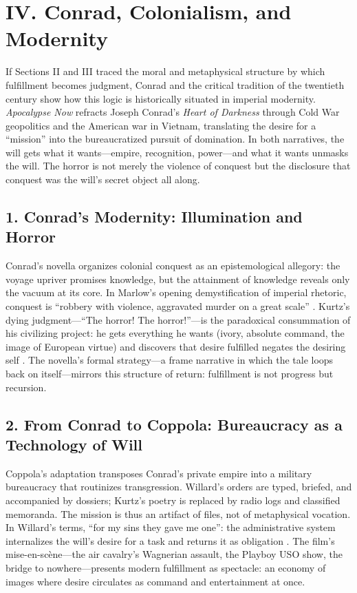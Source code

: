 \section*{IV. Conrad, Colonialism, and Modernity}
\label{sec:iv-conrad-colonialism-and-modernity}

If Sections II and III traced the moral and metaphysical structure by which fulfillment becomes judgment, Conrad and the critical tradition of the twentieth century show how this logic is historically situated in imperial modernity. \textit{Apocalypse Now} refracts Joseph Conrad’s \textit{Heart of Darkness} through Cold War geopolitics and the American war in Vietnam, translating the desire for a ``mission'' into the bureaucratized pursuit of domination. In both narratives, the will gets what it wants---empire, recognition, power---and what it wants unmasks the will. The horror is not merely the violence of conquest but the disclosure that conquest was the will’s secret object all along.

\subsection*{1. Conrad’s Modernity: Illumination and Horror}
\label{ssec:1-conrad-s-modernity-illumination-and-horror}
Conrad’s novella organizes colonial conquest as an epistemological allegory: the voyage upriver promises knowledge, but the attainment of knowledge reveals only the vacuum at its core. In Marlow’s opening demystification of imperial rhetoric, conquest is ``robbery with violence, aggravated murder on a great scale'' . Kurtz’s dying judgment---``The horror! The horror!''---is the paradoxical consummation of his civilizing project: he gets everything he wants (ivory, absolute command, the image of European virtue) and discovers that desire fulfilled negates the desiring self . The novella’s formal strategy---a frame narrative in which the tale loops back on itself---mirrors this structure of return: fulfillment is not progress but recursion.

\subsection*{2. From Conrad to Coppola: Bureaucracy as a Technology of Will}
\label{ssec:2-from-conrad-to-coppola-bureaucracy-as-a-technology-of-will}
Coppola’s adaptation transposes Conrad’s private empire into a military bureaucracy that routinizes transgression. Willard’s orders are typed, briefed, and accompanied by dossiers; Kurtz’s poetry is replaced by radio logs and classified memoranda. The mission is thus an artifact of files, not of metaphysical vocation. In Willard’s terms, ``for my sins they gave me one'': the administrative system internalizes the will’s desire for a task and returns it as obligation \parencite{CoppolaApocalypse1979}. The film’s mise-en-scène—the air cavalry’s Wagnerian assault, the Playboy USO show, the bridge to nowhere—presents modern fulfillment as spectacle: an economy of images where desire circulates as command and entertainment at once.

